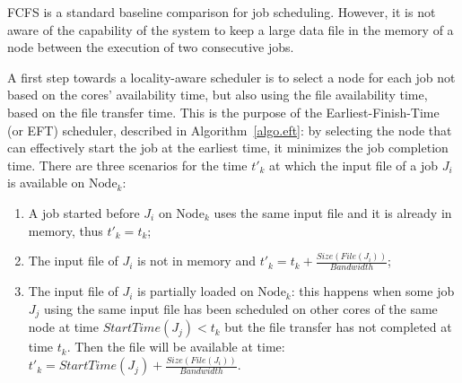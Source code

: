 \documentclass[conference,10pt]{IEEEtran}
\newcommand{\Node}[1]{\ensuremath{\mathrm{Node}_{#1}}\xspace}
\newcommand{\file}{\ensuremath{\mathit{File}}\xspace}
\newcommand{\size}{\ensuremath{\mathit{Size}}\xspace}
\newcommand{\bandwidth}{\mathit{Bandwidth}\xspace}
\newcommand{\start}{\mathit{StartTime}\xspace}
\begin{document}
FCFS is a standard baseline comparison
for job scheduling. However, it is not aware of the capability of the
system to keep a large data file in the memory of a node between the execution of
two consecutive jobs.

A first step towards a locality-aware scheduler
is to select a node for each job not based on the cores' availability
time, but also using the file availability time, based on the file
transfer time. This is the purpose of the Earliest-Finish-Time (or
EFT) scheduler, described in Algorithm~\ref{algo.eft}: by selecting
the node that can effectively start the job at the earliest time, it
minimizes the job completion time. There are three scenarios for the
time $t'_k$ at which the input file of a job $J_i$ is available on
\Node{k}:
\begin{enumerate}
\item A job started before $J_i$ on \Node{k} uses the same input
  file and it is already in memory, thus $t'_k=t_k$;
\item The input file of $J_i$ is not in memory and
  $t'_k=t_k+\frac{\size(\file(J_i))}{\bandwidth}$;
\item The input file of $J_i$ is partially loaded on \Node{k}: this
  happens when some
  job $J_j$ using the same input file has been scheduled on other cores of
  the same node at time $\start(J_j)<t_k$ but the file transfer has not
  completed at time $t_k$. Then the file will be available at time:
  $t'_k = \start(J_j)+\frac{\size(\file(J_i))}{\bandwidth}.$
\end{enumerate}


		
\end{document}

